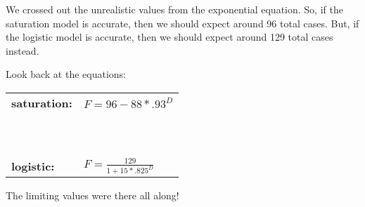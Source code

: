 We crossed out the unrealistic values from the exponential equation.  So, if the saturation model is accurate, then we should expect around 96 total cases.  But, if the logistic model is accurate, then we should expect around 129 total cases instead.

Look back at the equations:
\vspace{.05in} %
\begin{center}
\begin{tabular} {ll} 
 \textbf{saturation:} & $F=96-88\ast.93^D$ \\ 
 \begin{tiny} ~ \end{tiny} \\
 \textbf{logistic:} & $\displaystyle F=\frac{129}{1+15 \ast .825^D}$ \\
\end{tabular}
\end{center} 
\vspace{.05in} %
The limiting values were there all along!

